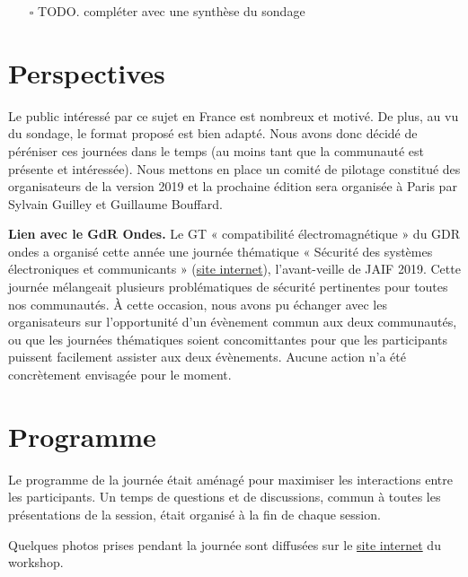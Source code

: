 \documentclass[a4paper,11pt]{article}
\begin{document}
\begin{itemize}
\item[{$\square$}] TODO.  compléter avec une synthèse du sondage
\end{itemize}

\section{Perspectives}
\label{sec:orgc9ee6b5}

Le public intéressé par ce sujet en France est nombreux et motivé. De
plus, au vu du sondage, le format proposé est bien adapté. Nous avons
donc décidé de péréniser ces journées dans le temps (au moins tant que
la communauté est présente et intéressée). Nous mettons en place un
comité de pilotage constitué des organisateurs de la version 2019 et
la prochaine édition sera organisée à Paris par Sylvain Guilley et Guillaume
Bouffard.

\textbf{Lien avec le GdR Ondes.} Le GT « compatibilité électromagnétique » du
GDR ondes a organisé cette année une journée thématique « Sécurité des
systèmes électroniques et communicants » (\href{http://gdr-ondes.cnrs.fr/2019/02/14/journee-thematique-securite-des-systemes-electroniques-et-communicants-21-mai-2019-paris-jussieu}{site internet}),
l'avant-veille de JAIF 2019.  Cette journée mélangeait plusieurs
problématiques de sécurité pertinentes pour toutes nos communautés.  À
cette occasion, nous avons pu échanger avec les organisateurs sur
l'opportunité d'un évènement commun aux deux communautés, ou que les
journées thématiques soient concomittantes pour que les participants
puissent facilement assister aux deux évènements.  Aucune action n'a
été concrètement envisagée pour le moment.

\section{Programme}
\label{sec:org20a4960}
Le programme de la journée était aménagé pour maximiser les
interactions entre les participants.  Un temps de questions et de
discussions, commun à toutes les présentations de la session, était
organisé à la fin de chaque session.

Quelques photos prises pendant la journée sont diffusées sur le \href{https://jaif2019.github.io/photos.html}{site
internet} du workshop.
\end{document}
